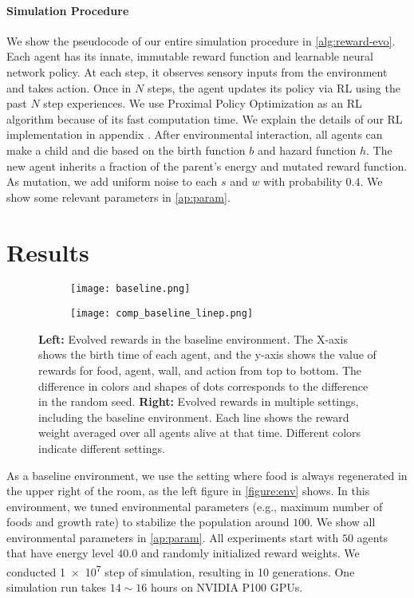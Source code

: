 \paragraph{Simulation Procedure}
We show the pseudocode of our entire simulation procedure in \cref{alg:reward-evo}. Each agent has its innate, immutable reward function and learnable neural network policy. At each step, it observes sensory inputs from the environment and takes action. Once in $N$ steps, the agent updates its policy via RL using the past $N$ step experiences. We use Proximal Policy Optimization \citep{schulmanProximalPolicyOptimization2017} as an RL algorithm because of its fast computation time. We explain the details of our RL implementation in appendix . After environmental interaction, all agents can make a child and die based on the birth function $b$ and hazard function $h$. The new agent inherits a fraction of the parent's energy and mutated reward function. As mutation, we add uniform noise to each $s$ and $w$ with probability $0.4$. We show some relevant parameters in \cref{ap:param}.

\section{Results}

\begin{figure}[t]
  \begin{subfigure}[t]{7cm}
    \centering
    \texttt{[image: baseline.png]}
  \end{subfigure}
  \begin{subfigure}[t]{8cm}
    \centering
    \texttt{[image: comp\_baseline\_linep.png]}
  \end{subfigure}
  \caption{
    \textbf{Left:} Evolved rewards in the baseline environment. The X-axis shows the birth time of each agent, and the y-axis shows the value of rewards for food, agent, wall, and action from top to bottom. The difference in colors and shapes of dots corresponds to the difference in the random seed.
    \textbf{Right:} Evolved rewards in multiple settings, including the baseline environment. Each line shows the reward weight averaged over all agents alive at that time. Different colors indicate different settings.
  }\label{figure:baseline-result}
\end{figure}

As a baseline environment, we use the setting where food is always regenerated in the upper right of the room, as the left figure in \cref{figure:env} shows. In this environment, we tuned environmental parameters (e.g., maximum number of foods and growth rate) to stabilize the population around $100$. We show all environmental parameters in \cref{ap:param}. All experiments start with $50$ agents that have energy level $40.0$ and randomly initialized reward weights. We conducted \num{1e7} step of simulation, resulting in 10  generations. One simulation run takes $14\sim16$ hours on NVIDIA P100 GPUs.

